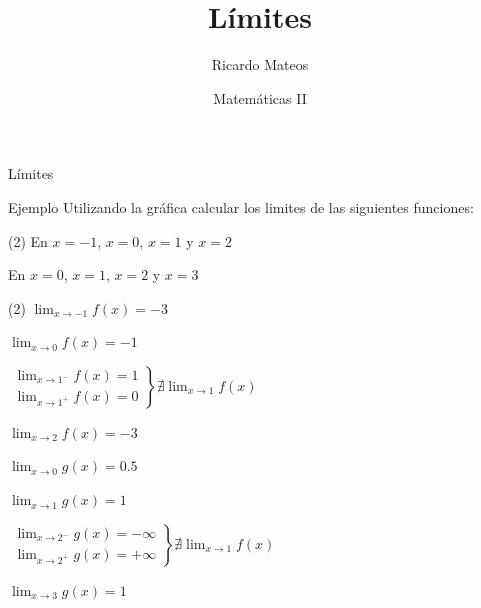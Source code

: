 \documentclass[8pt,handout]{beamer}
\title{Límites}
\author{Ricardo Mateos}
\institute[UHEI-IVED]{Departamento de Matemáticas \\ UHEI - IVED}
\date{Matemáticas II}
\newcommand{\limite}[2]{\displaystyle \lim_{x \rightarrow #1}{#2}}
\begin{document}
\begin{frame}
\maketitle
\end{frame}

\begin{frame}
\tableofcontents
\end{frame}

\begin{frame}{Límites}
\begin{exampleblock}{Ejemplo}
Utilizando la gráfica calcular los limites de las siguientes funciones:
 \begin{tasks}[label=\alph*)](2)
\task 
En $x=-1$, $x=0$, $x=1$ y $x=2$

\task
En  $x=0$, $x=1$, $x=2$ y $x=3$

\end{tasks}
\end{exampleblock}

\begin{tasks}[label=\alph*)](2)
\task 
$\limite{-1}{f(x)}= -3$

$\limite{0}{f(x)}= -1$

$ \left. \begin{array}{l}
\limite{1^{-}}{f(x)} = 1 \\
\limite{1^{+}}{f(x)}= 0
\end{array} \right\rbrace  \nexists \limite{1}{f(x)}$

$\limite{2}{f(x)}=-3$

\task
$\limite{0}{g(x)}= 0.5$

$\limite{1}{g(x)}=1$

$ \left. \begin{array}{l}
\limite{2^{-}}{g(x)} = -\infty \\
\limite{2^{+}}{g(x)}= +\infty
\end{array} \right\rbrace  \nexists \limite{1}{f(x)}$

$\limite{3}{g(x)}=1$

\end{tasks}
\end{frame}
\end{document}
